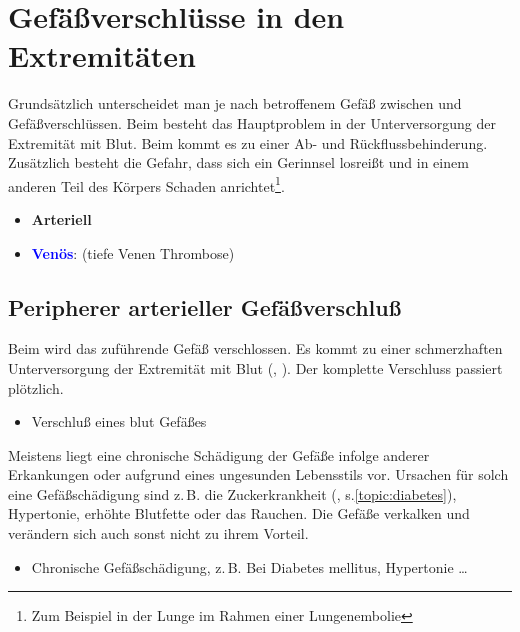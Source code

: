 \bigskip

\section{Gefäßverschlüsse in den Extremitäten}
\label{topic:gefaessverschluesse-extremitaeten}

{%
Grundsätzlich unterscheidet man je nach betroffenem Gefäß
zwischen  und 
Gefäßverschlüssen. 
Beim  besteht
das Hauptproblem in der Unterversorgung der Extremität mit
Blut. Beim  kommt es zu einer Ab- und
Rückflussbehinderung. Zusätzlich besteht die Gefahr, dass sich
ein Gerinnsel losreißt und in einem anderen Teil des
Körpers Schaden anrichtet\footnote{Zum Beispiel in der
Lunge im Rahmen einer Lungenembolie}.
}{
\begin{itemize}
  \item \textbf{\textcolor[rgb]{0.7882353,0.0,0.08627451}{Arteriell}}
  \item \textbf{\textcolor{blue}{Venös}}:
   (tiefe Venen Thrombose)
\end{itemize}
}{}{}{}



\subsection{Peripherer arterieller Gefäßverschluß}
\label{topic:arterieller-gefaessverschluss}

{%
Beim  wird das
zuführende Gefäß verschlossen. Es kommt zu einer schmerzhaften 
Unterversorgung der Extremität mit Blut
(,
). Der komplette Verschluss passiert plötzlich. }
{
\begin{itemize}
    \item Verschluß eines blut Gefäßes
\end{itemize}
}{}{}{}

{%
Meistens liegt eine 
chronische Schädigung der
Gefäße infolge anderer Erkankungen oder aufgrund eines
ungesunden Lebensstils vor. Ursachen für solch eine
Gefäßschädigung sind z.\,B. die Zuckerkrankheit (, s.\ref{topic:diabetes}), Hypertonie, erhöhte
Blutfette oder das Rauchen. Die Gefäße verkalken und
verändern sich auch sonst nicht zu ihrem Vorteil.
}
{
\begin{itemize}
  \item Chronische Gefäßschädigung, z.\,B. Bei Diabetes mellitus, Hypertonie \ldots
\end{itemize}
}{}{}{}



